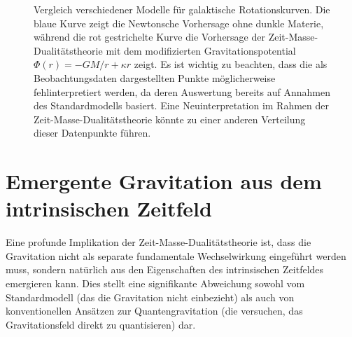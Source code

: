 \documentclass{article}
\theoremstyle{definition}
\theoremstyle{remark}
\begin{document}
		\begin{figure}[h]
			\centering
			\caption{Vergleich verschiedener Modelle für galaktische Rotationskurven. Die blaue Kurve zeigt die Newtonsche Vorhersage ohne dunkle Materie, während die rot gestrichelte Kurve die Vorhersage der Zeit-Masse-Dualitätstheorie mit dem modifizierten Gravitationspotential $\Phi(r) = -GM/r + \kappa r$ zeigt. Es ist wichtig zu beachten, dass die als Beobachtungsdaten dargestellten Punkte möglicherweise fehlinterpretiert werden, da deren Auswertung bereits auf Annahmen des Standardmodells basiert. Eine Neuinterpretation im Rahmen der Zeit-Masse-Dualitätstheorie könnte zu einer anderen Verteilung dieser Datenpunkte führen.}
			

		\end{figure}
		
		\section{Emergente Gravitation aus dem intrinsischen Zeitfeld}
		
		Eine profunde Implikation der Zeit-Masse-Dualitätstheorie ist, dass die Gravitation nicht als separate fundamentale Wechselwirkung eingeführt werden muss, sondern natürlich aus den Eigenschaften des intrinsischen Zeitfeldes emergieren kann. Dies stellt eine signifikante Abweichung sowohl vom Standardmodell (das die Gravitation nicht einbezieht) als auch von konventionellen Ansätzen zur Quantengravitation (die versuchen, das Gravitationsfeld direkt zu quantisieren) dar.
		
\end{document}
